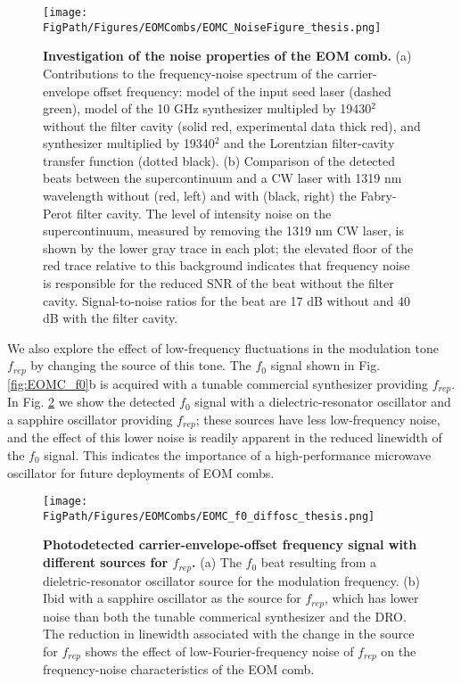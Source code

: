 \begin{figure}[htpb]
	\begin{center}
		\texttt{[image: \\FigPath/Figures/EOMCombs/EOMC\_NoiseFigure\_thesis.png]}
	\end{center}
	\caption[Investigation of the noise properties of the EOM comb]{\textbf{Investigation of the noise properties of the EOM comb.}  (a) Contributions to the frequency-noise spectrum of the carrier-envelope offset frequency: model of the input seed laser (dashed green), model of the 10 GHz synthesizer multipled by 19430$^2$ without the filter cavity (solid red, experimental data thick red), and synthesizer multiplied by 19340$^2$ and the Lorentzian filter-cavity transfer function (dotted black). (b) Comparison of the detected beats between the supercontinuum and a CW laser with 1319 nm wavelength without (red, left) and with (black, right) the Fabry-Perot filter cavity. The level of intensity noise on the supercontinuum, measured by removing the 1319 nm CW laser, is shown by the lower gray trace in each plot; the elevated floor of the red trace relative to this background indicates that frequency noise is responsible for the reduced SNR of the beat without the filter cavity. Signal-to-noise ratios for the beat are 17 dB without and 40 dB with the filter cavity.}
	\label{fig:EOMC_noise}
\end{figure} 

We also explore the effect of low-frequency fluctuations in the modulation tone $f_{rep}$ by changing the source of this tone. The $f_0$ signal shown in Fig. \ref{fig:EOMC_f0}b is acquired with a tunable commercial synthesizer providing $f_{rep}$. In Fig. \ref{fig:EOMC_f0_sources} we show the detected $f_0$ signal with a dielectric-resonator oscillator and a sapphire oscillator providing $f_{rep}$; these sources have less low-frequency noise, and the effect of this lower noise is readily apparent in the reduced linewidth of the $f_0$ signal. This indicates the importance of a high-performance microwave oscillator for future deployments of EOM combs.



\begin{figure}[htpb]
	\begin{center}
		\texttt{[image: \\FigPath/Figures/EOMCombs/EOMC\_f0\_diffosc\_thesis.png]}
	\end{center}
	\caption[Photodetected carrier-envelope-offset frequency signal with different sources for $f_{rep}$]{\textbf{Photodetected carrier-envelope-offset frequency signal with different sources for $f_{rep}$.} (a) The $f_0$ beat resulting from a dieletric-resonator oscillator source for the modulation frequency. (b) Ibid with a sapphire oscillator as the source for $f_{rep}$, which has lower noise than both the tunable commerical synthesizer and the DRO. The reduction in linewidth associated with the change in the source for $f_{rep}$ shows the effect of low-Fourier-frequency noise of $f_{rep}$ on the frequency-noise characteristics of the EOM comb. }
	\label{fig:EOMC_f0_sources}
\end{figure} 


